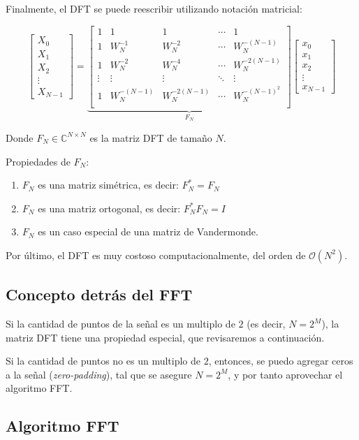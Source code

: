 Finalmente, el DFT se puede reescribir utilizando notación matricial:

\begin{equation}
    \begin{bmatrix}
        X_0 \\ X_1 \\ X_2 \\ \vdots \\ X_{N-1}
    \end{bmatrix}
    =
    \underbrace
    {
    \begin{bmatrix}
        1 & 1 & 1 & \cdots & 1 \\
        1 & W_N^{-1} & W_N^{-2} & \cdots & W_N^{-(N-1)} \\
        1 & W_N^{-2} & W_N^{-4} & \cdots & W_N^{-2(N-1)} \\
        \vdots & \vdots & \vdots & \ddots & \vdots\\
        1 & W_N^{-(N-1)} & W_N^{-2(N-1)} & \cdots & W_N^{-(N-1)^2} \\
    \end{bmatrix}
    }_{F_N}
    \begin{bmatrix}
        x_0 \\ x_1 \\ x_2 \\ \vdots \\ x_{N-1}
    \end{bmatrix}
\end{equation}

Donde $F_N \in \mathbb{C}^{N\times N}$ es la matriz DFT de tamaño $N$.

Propiedades de $F_N$:

\begin{enumerate}
    \item $F_N$ es una matriz simétrica, es decir: $F_N^* = F_N$
    \item $F_N$ es una matriz ortogonal, es decir: $F_N^* F_N = I$
    \item $F_N$ es un caso especial de una matriz de Vandermonde.
\end{enumerate}

Por último, el DFT es muy costoso computacionalmente, del orden de $\mathcal{O}(N^2)$.

\subsection{Concepto detrás del FFT}

Si la cantidad de puntos de la señal es un multiplo de $2$ (es decir, $N=2^M$), la matriz DFT tiene una propiedad especial, que revisaremos a continuación.


Si la cantidad de puntos no es un multiplo de $2$, entonces, se puedo agregar ceros a la señal (\emph{zero-padding}), tal que se asegure $N=2^M$, y por tanto aprovechar el algoritmo FFT.

\subsection{Algoritmo FFT}